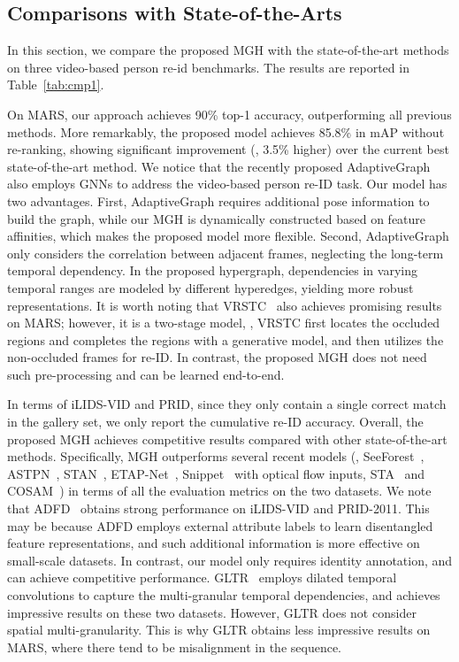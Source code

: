 \documentclass[10pt,twocolumn,letterpaper]{article}
\begin{document}
\subsection{Comparisons with State-of-the-Arts}
In this section, we compare the proposed MGH with the state-of-the-art methods on three video-based person re-id benchmarks. The results are reported in Table~\ref{tab:cmp1}. 

On MARS, our approach achieves 90\% top-1 accuracy, outperforming all previous methods. More remarkably, the proposed model achieves 85.8\% in mAP without re-ranking, showing significant improvement (\ie, 3.5\% higher) over the current best state-of-the-art method. We notice that the recently proposed AdaptiveGraph~\cite{DBLP:journals/corr/abs-1909-02240} also employs GNNs to address the video-based person re-ID task. Our model has two advantages. First, AdaptiveGraph requires additional pose information to build the graph, while our MGH is dynamically constructed based on feature affinities, which makes the proposed model more flexible. Second, AdaptiveGraph only considers the correlation between adjacent frames, neglecting the long-term temporal dependency. In the proposed hypergraph, dependencies in varying temporal ranges are modeled by different hyperedges, yielding more robust representations. It is worth noting that VRSTC~\cite{DBLP:conf/cvpr/HouMCGSC19} also achieves promising results on MARS; however, it is a two-stage model, \ie, VRSTC first locates the occluded regions and completes the regions with a generative model, and then utilizes the non-occluded frames for re-ID. In contrast, the proposed MGH does not need such pre-processing and can be learned end-to-end.


In terms of iLIDS-VID and PRID, since they only contain a single correct match in the gallery set, we only report the cumulative re-ID accuracy. Overall, the proposed MGH achieves competitive results compared with other state-of-the-art methods. Specifically, MGH outperforms several recent models (\ie, SeeForest~\cite{DBLP:conf/cvpr/ZhouHWWT17}, ASTPN~\cite{DBLP:conf/iccv/XuCG0CZ17}, STAN~\cite{DBLP:conf/cvpr/LiB0W18}, ETAP-Net~\cite{DBLP:conf/cvpr/WuLDYO018},
Snippet~\cite{DBLP:conf/cvpr/ChenLXYW18} with optical flow inputs, STA~\cite{DBLP:conf/aaai/FuWWH19} and COSAM~\cite{Subramaniam_2019_ICCV}) in terms of all the evaluation metrics on the two datasets. We note that ADFD~\cite{DBLP:conf/cvpr/ZhaoSJL019} obtains strong performance on iLIDS-VID and PRID-2011. This may be because ADFD employs external attribute labels to learn disentangled feature representations, and such additional information is more effective on small-scale datasets. In contrast, our model only requires identity annotation, and can achieve competitive performance. GLTR~\cite{DBLP:journals/corr/abs-1908-10049} employs dilated temporal convolutions to capture the multi-granular temporal dependencies, and achieves impressive results on these two datasets. However, GLTR does not consider spatial multi-granularity. This is why GLTR obtains less impressive results on MARS, where there tend to be misalignment in the sequence.
\end{document}
